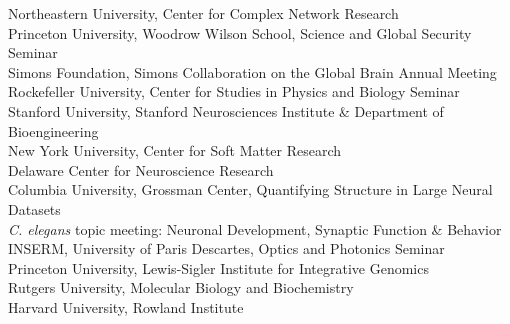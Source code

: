 \documentclass[11pt]{article}
\makeatletter
\newlength{\bibhang}
\newlength{\bibsep}
\newcounter{Lcount}
 {\@listi \global\bibsep\itemsep \global\advance\bibsep by\parsep}
\newenvironment{bibsection}%
        {\begin{list}{\arabic{Lcount}.}{%
       \usecounter{Lcount}%
       \setlength\labelwidth{-0.5em}%
       \setlength{\leftmargin}{\bibhang}%
       \setlength{\itemindent}{-\leftmargin}%
       \setlength{\itemsep}{\bibsep}%
       \setlength{\parsep}{\z@}%
        \setlength{\partopsep}{0pt}%
        \setlength{\topsep}{0pt}}}
        {\end{list}\vspace{-.6\baselineskip}}
\renewcommand{\section}{\@startsection
{section}%
{1}%
{0mm}%
{2\baselineskip}%
{0.5\baselineskip}%
{\normalfont\bf\MakeUppercase}} %
\makeatother
\begin{document}
Northeastern University, Center for Complex Network Research  \\ 
Princeton University, Woodrow Wilson School, Science and Global Security Seminar \\
Simons Foundation, Simons Collaboration on the Global Brain Annual Meeting \\
Rockefeller University, Center for Studies in Physics and Biology Seminar \\
 Stanford University, Stanford Neurosciences Institute \& Department of Bioengineering \\
 New York University, Center for Soft Matter Research \\
 Delaware Center for Neuroscience Research  \\
 Columbia University, Grossman Center, Quantifying Structure in Large Neural Datasets \\
 \textit{C. elegans} topic meeting: Neuronal Development, Synaptic Function
\& Behavior \\ 
 INSERM, University of Paris Descartes, Optics and Photonics Seminar \\
 Princeton University, Lewis-Sigler Institute for Integrative Genomics  \\
 Rutgers University,  Molecular Biology and Biochemistry \\
 Harvard University, Rowland Institute   \\





\end{document}

